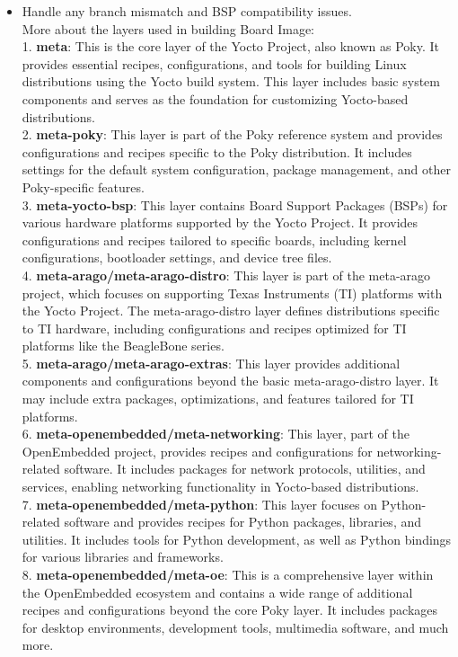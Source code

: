 \begin{itemize}
    \item Handle any branch mismatch and BSP compatibility issues.\\
    More about the layers used in building Board Image: \\
1.	\textbf{meta}: This is the core layer of the Yocto Project, also known as Poky. It provides essential recipes, configurations, and tools for building Linux distributions using the Yocto build system. This layer includes basic system components and serves as the foundation for customizing Yocto-based distributions. \\
2.	\textbf{meta-poky}: This layer is part of the Poky reference system and provides configurations and recipes specific to the Poky distribution. It includes settings for the default system configuration, package management, and other Poky-specific features. \\
3.	\textbf{meta-yocto-bsp}: This layer contains Board Support Packages (BSPs) for various hardware platforms supported by the Yocto Project. It provides configurations and recipes tailored to specific boards, including kernel configurations, bootloader settings, and device tree files. \\
4.	\textbf{meta-arago/meta-arago-distro}: This layer is part of the meta-arago project, which focuses on supporting Texas Instruments (TI) platforms with the Yocto Project. The meta-arago-distro layer defines distributions specific to TI hardware, including configurations and recipes optimized for TI platforms like the BeagleBone series. \\ 
5.	\textbf{meta-arago/meta-arago-extras}: This layer provides additional components and configurations beyond the basic meta-arago-distro layer. It may include extra packages, optimizations, and features tailored for TI platforms. \\
6.	\textbf{meta-openembedded/meta-networking}: This layer, part of the OpenEmbedded project, provides recipes and configurations for networking-related software. It includes packages for network protocols, utilities, and services, enabling networking functionality in Yocto-based distributions. \\
7.	\textbf{meta-openembedded/meta-python}: This layer focuses on Python-related software and provides recipes for Python packages, libraries, and utilities. It includes tools for Python development, as well as Python bindings for various libraries and frameworks. \\
8.	\textbf{meta-openembedded/meta-oe}: This is a comprehensive layer within the OpenEmbedded ecosystem and contains a wide range of additional recipes and configurations beyond the core Poky layer. It includes packages for desktop environments, development tools, multimedia software, and much more. \\

\end{itemize}
